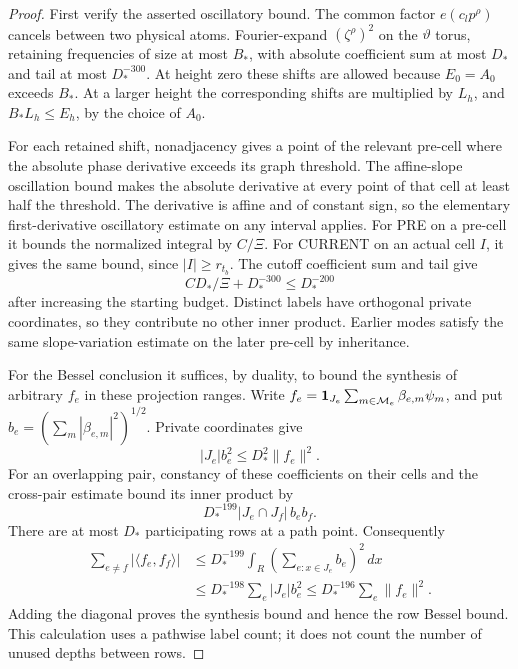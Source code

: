 \begin{proof}
First verify the asserted oscillatory bound.  The common factor
\(e(c_lp^\rho)\) cancels between two physical atoms.
Fourier-expand \((\zeta^\rho)^2\) on the \(\vartheta\) torus,
retaining frequencies of size at most \(B_*\), with absolute
coefficient sum at most \(D_*\) and tail at most \(D_*^{-300}\).
At height zero these shifts are allowed because \(E_0=A_0\)
exceeds \(B_*\).  At a larger height the corresponding shifts are
multiplied by \(L_h\), and
\(B_*L_h\le E_h\), by the choice of \(A_0\).

For each retained shift, nonadjacency gives a point of the relevant
pre-cell where the absolute phase derivative exceeds its graph
threshold.  The affine-slope oscillation bound makes the absolute
derivative at every point of that cell at least half the threshold.
The derivative is affine and of constant sign, so the elementary
first-derivative oscillatory estimate on any interval applies.
For PRE on a pre-cell it bounds the normalized integral by
\(C/\Xi\).  For CURRENT on an actual cell \(I\), it gives the same
bound, since \(|I|\ge r_{t_b}\).
The cutoff coefficient sum and tail give
\[
 C D_*/\Xi+D_*^{-300}\le D_*^{-200}
\]
after increasing the starting budget.  Distinct labels have
orthogonal private coordinates, so they contribute no other inner
product.  Earlier modes satisfy the same slope-variation estimate
on the later pre-cell by inheritance.

For the Bessel conclusion it suffices, by duality, to bound the
synthesis of arbitrary \(f_e\) in these projection ranges.
Write \(f_e=\mathbf 1_{J_e}\sum_{m\in\mathcal M_e}\beta_{e,m}\psi_m\), and
put \(b_e=(\sum_m|\beta_{e,m}|^2)^{1/2}\).
Private coordinates give
\[
 |J_e|b_e^2\le D_*^2\|f_e\|^2.
\]
For an overlapping pair, constancy of these coefficients on their
cells and the cross-pair estimate bound its inner product by
\[
 D_*^{-199}|J_e\cap J_f|\,b_eb_f.
\]
There are at most \(D_*\) participating rows at a path point.
Consequently
\[
 \begin{split}
 \sum_{e\ne f}|\langle f_e,f_f\rangle|
 &\le D_*^{-199}
       \int_R\left(\sum_{e:x\in J_e}b_e\right)^2\,dx\\
 &\le D_*^{-198}\sum_e|J_e|b_e^2
 \le D_*^{-196}\sum_e\|f_e\|^2 .
 \end{split}
\]
Adding the diagonal proves the synthesis bound and hence the row
Bessel bound.  This calculation uses a pathwise label count; it
does not count the number of unused depths between rows.
\end{proof}

